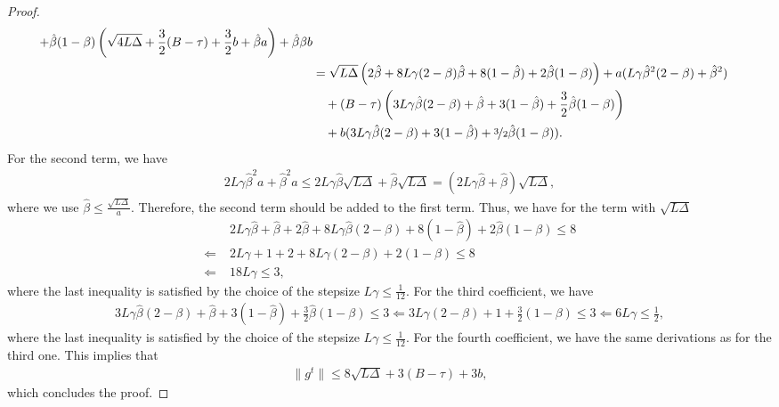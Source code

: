 \documentclass[a4paper,11pt]{article}
\begin{document}
\begin{proof}
\begin{align*}
        + \hat{\beta}(1-\beta)\left(\sqrt{4L\Delta} + \frac{3}{2}(B-\tau) + \frac{3}{2}b + \hat{\beta}a\right)
        + \hat{\beta}\beta b\\
        &= \sqrt{L\Delta}\left(2\hat{\beta}
        + 8L\gamma(2-\beta)\hat{\beta}
        + 8(1-\hat{\beta})
        + 2\hat{\beta}(1-\beta)\right)
        + a(L\gamma\hat{\beta}^2(2-\beta) + \hat{\beta}^2)\\
        &\quad + (B-\tau)\left(3L\gamma\hat{\beta}(2-\beta) + \hat{\beta} + 3(1-\hat{\beta})
        + \frac{3}{2}\hat{\beta}(1-\beta)\right)\\
        &\quad + b(3L\gamma\hat{\beta}(2-\beta) + 3(1-\hat{\beta}) + \nicefrac{3}{2}\hat{\beta}(1-\beta)).
    \end{align*}
    For the second term, we have
    \begin{align*}
        2L\gamma\hat{\beta}^2a + \hat{\beta}^2a \le 2L\gamma\hat{\beta}\sqrt{L\Delta} + \hat{\beta}\sqrt{L\Delta} = (2L\gamma\hat{\beta} + \hat{\beta})\sqrt{L\Delta},
    \end{align*}
    where we use $\hat{\beta} \le \frac{\sqrt{L\Delta}}{a}.$ Therefore, the second term should be added to the first term. Thus, we have for the term with $\sqrt{L\Delta}$
    \begin{align*}
        &2L\gamma\hat{\beta} + \hat{\beta}
        + 2\hat{\beta}
        + 8L\gamma\hat{\beta}(2-\beta) 
        + 8(1-\hat{\beta})
        + 2\hat{\beta}(1-\beta) \le 8\\ 
        \Leftarrow\; & 2L\gamma + 1 + 2 + 8L\gamma(2-\beta) + 2(1-\beta) \le 8 \\
        \Leftarrow\;& 18L\gamma \le 3,
    \end{align*}
    where the last inequality is satisfied by the choice of the stepsize $L\gamma \le \frac{1}{12}.$ For the third coefficient, we have
    \begin{align*}
        3L\gamma\hat{\beta}(2-\beta) 
        + \hat{\beta}
        + 3(1-\hat{\beta})
        + \frac{3}{2}\hat{\beta}(1-\beta) \le 3 
        \Leftarrow 3L\gamma(2-\beta) + 1 
        + \frac{3}{2}(1-\beta) \le 3 
        \Leftarrow 6L\gamma \le \frac{1}{2},
    \end{align*}
     where the last inequality is satisfied by the choice of the stepsize $L\gamma \le \frac{1}{12}.$ For the fourth coefficient, we have the same derivations as for the third one. This implies that 
     \begin{align*}
         \|g^t\| \le 8\sqrt{L\Delta} + 3(B-\tau) + 3b,
     \end{align*}
     which concludes the proof.
     
\end{proof}
\end{document}
